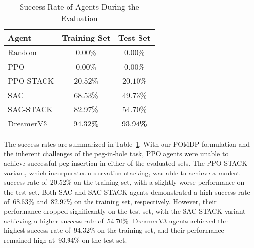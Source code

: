 \begin{table}[ht]
    \centering
    \caption{Success Rate of Agents During the Evaluation}
    \label{tab:success-rate}
    \begin{tabular}{lcc}
        \hline
        \textbf{Agent} & \textbf{Training Set}                       & \textbf{Test Set}                           \\
        \hline
        Random         & \hspace{4pt}\(0.00\)\%                      & \hspace{4pt}\(0.00\)\%                      \\
        PPO            & \hspace{4pt}\(0.00\)\%                      & \hspace{4pt}\(0.00\)\%                      \\
        PPO-STACK      & \(20.52\)\%                                 & \(20.10\)\%                                 \\
        SAC            & \(68.53\)\%                                 & \(49.73\)\%                                 \\
        SAC-STACK      & \(82.97\)\%                                 & \(54.70\)\%                                 \\
        DreamerV3      & \hspace{1.5pt}\(\mathbf{94.32}\)\textbf{\%} & \hspace{1.5pt}\(\mathbf{93.94}\)\textbf{\%} \\
        \hline
    \end{tabular}
\end{table}

The success rates are summarized in Table~\ref{tab:success-rate}. With our POMDP formulation and the inherent challenges of the peg-in-hole task, PPO agents were unable to achieve successful peg insertion in either of the evaluated sets. The PPO-STACK variant, which incorporates observation stacking, was able to achieve a modest success rate of~20.52\% on the training set, with a slightly worse performance on the test set. Both SAC and SAC-STACK agents demonstrated a high success rate of~68.53\% and~82.97\% on the training set, respectively. However, their performance dropped significantly on the test set, with the SAC-STACK variant achieving a higher success rate of~54.70\%. DreamerV3 agents achieved the highest success rate of~94.32\% on the training set, and their performance remained high at~93.94\% on the test set.

